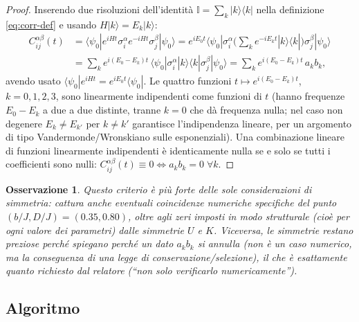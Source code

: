 \documentclass[11pt,a4paper]{article}
\newtheorem{osservazione}{Osservazione}
\begin{document}
\begin{proof}
Inserendo due risoluzioni dell'identità $\mathbb I=\sum_k|k\rangle\langle k|$ nella definizione
\eqref{eq:corr-def} e usando $H|k\rangle=E_k|k\rangle$:
\begin{align}
C_{ij}^{\alpha\beta}(t) &= \langle\psi_0|e^{iHt}\sigma_i^\alpha e^{-iHt}\sigma_j^\beta|\psi_0\rangle
= e^{iE_0t}\langle\psi_0|\sigma_i^\alpha\Big(\sum_k e^{-iE_kt}|k\rangle\langle k|\Big)\sigma_j^\beta|\psi_0\rangle \\
&= \sum_k e^{i(E_0-E_k)t}\,\langle\psi_0|\sigma_i^\alpha|k\rangle\langle k|\sigma_j^\beta|\psi_0\rangle
= \sum_k e^{i(E_0-E_k)t}\,a_k b_k,
\end{align}
avendo usato $\langle\psi_0|e^{iHt}=e^{iE_0t}\langle\psi_0|$. Le quattro funzioni
$t\mapsto e^{i(E_0-E_k)t}$, $k=0,1,2,3$, sono linearmente indipendenti come funzioni di $t$
(hanno frequenze $E_0-E_k$ a due a due distinte, tranne $k=0$ che dà frequenza nulla; nel caso
non degenere $E_k\neq E_{k'}$ per $k\neq k'$ garantisce l'indipendenza lineare, per un argomento
di tipo Vandermonde/Wronskiano sulle esponenziali). Una combinazione lineare di funzioni
linearmente indipendenti è identicamente nulla se e solo se tutti i coefficienti sono nulli:
$C_{ij}^{\alpha\beta}(t)\equiv0 \iff a_kb_k=0\;\forall k$.
\end{proof}

\begin{osservazione}
Questo criterio è \emph{più forte} delle sole considerazioni di simmetria: cattura anche
eventuali coincidenze numeriche specifiche del punto $(b/J,D/J)=(0.35,0.80)$, oltre agli zeri
imposti in modo strutturale (cioè per ogni valore dei parametri) dalle simmetrie $U$ e $K$.
Viceversa, le simmetrie restano preziose perché spiegano \emph{perché} un dato $a_kb_k$ si
annulla (non è un caso numerico, ma la conseguenza di una legge di conservazione/selezione), il
che è esattamente quanto richiesto dal relatore (``non solo verificarlo numericamente'').
\end{osservazione}

\subsection{Algoritmo}
\end{document}

